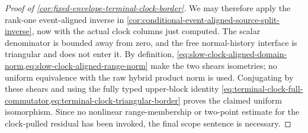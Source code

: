 \begin{proof}[Proof of
\cref{cor:fixed-envelope-terminal-clock-border}]
We may therefore apply the rank-one event-aligned inverse in
\cref{cor:conditional-event-aligned-source-split-inverse}, now with the
actual clock columns just computed.  The scalar denominator is bounded
away from zero, and the free normal-history interface is triangular and
does not enter it.  By definition,
\cref{eq:slow-clock-aligned-domain-norm,eq:slow-clock-aligned-range-norm}
make the two shears isometries; no uniform equivalence with the raw hybrid
product norm is used.  Conjugating by these shears and using the fully
typed upper-block identity
\cref{eq:terminal-clock-full-commutator,eq:terminal-clock-triangular-border}
proves the claimed uniform isomorphism.  Since no nonlinear
range-membership or two-point estimate for the clock-pulled residual has
been invoked, the final scope sentence is necessary.
\end{proof}

